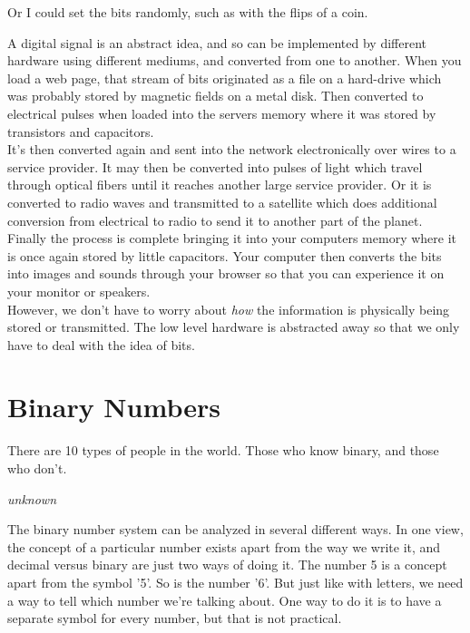 \begin{center}\end{center}

Or I could set the bits randomly, such as with the flips of a coin.

\begin{center}\end{center}

A digital signal is an abstract idea, and so can be implemented by different hardware using different mediums, and converted from one to another. When you load a web page, that stream of bits originated as a file on a hard-drive which was probably stored by magnetic fields on a metal disk. Then converted to electrical pulses when loaded into the servers memory where it was stored by transistors and capacitors.\\

It's then converted again and sent into the network electronically over wires to a service provider. It may then be converted into pulses of light which travel through optical fibers until it reaches another large service provider. Or it is converted to radio waves and transmitted to a satellite which does additional conversion from electrical to radio to send it to another part of the planet. Finally the process is complete bringing it into your computers memory where it is once again stored by little capacitors. Your computer then converts the bits into images and sounds through your browser so that you can experience it on your monitor or speakers.\\

However, we don't have to worry about \textit{how} the information is physically being stored or transmitted. The low level hardware is abstracted away so that we only have to deal with the idea of bits.

\section{Binary Numbers}

\epigraph{There are 10 types of people in the world. Those who know binary, and those who don't.}{\textit{unknown}}

The binary number system can be analyzed in several different ways. In one view, the concept of a particular number exists apart from the way we write it, and decimal versus binary are just two ways of doing it. The number 5 is a concept apart from the symbol '5'. So is the number '6'. But just like with letters, we need a way to tell which number we're talking about. One way to do it is to have a separate symbol for every number, but that is not practical.\\

